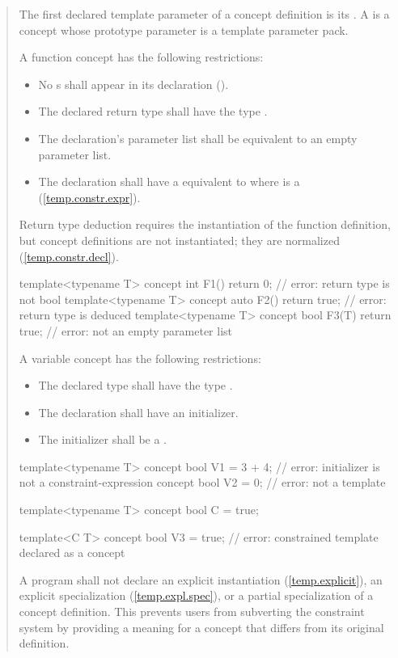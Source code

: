 \begin{quote}
\pnum
The first declared template parameter of a concept definition is its
. 
%
A  is a concept whose prototype parameter
is a template parameter pack.

\pnum
A function concept has the following restrictions:
\begin{itemize}
\item No s shall
     appear in its declaration ().

\item The declared return type shall have the type .

\item The declaration's parameter list shall be equivalent to an empty 
      parameter list.

\item The declaration shall have a  equivalent
to  where  is a 
 (\ref{temp.constr.expr}).
\end{itemize}
%
\enternote
Return type deduction requires the instantiation of the function 
definition, but concept definitions are not instantiated; they
are normalized (\ref{temp.constr.decl}).
\exitnote
%
\enterexample
\begin{codeblock}
template<typename T> 
  concept int F1() { return 0; }      // error: return type is not bool
template<typename T> 
  concept auto F2() { return true; }  // error: return type is deduced
template<typename T> 
  concept bool F3(T) { return true; } // error: not an empty parameter list
\end{codeblock}
\exitexample

\pnum
A variable concept has the following restrictions:
\begin{itemize}
\item The declared type shall have the type .
\item The declaration shall have an initializer.
\item The initializer shall be a .
\end{itemize}
%
\enterexample
\begin{codeblock}
template<typename T> 
  concept bool V1 = 3 + 4; // error: initializer is not a constraint-expression
concept bool V2 = 0;       // error: not a template

template<typename T> concept bool C = true;

template<C T> 
  concept bool V3 = true;  // error: constrained template declared as a concept
\end{codeblock}
\exitexample

\pnum
A program shall not declare an explicit instantiation (\ref{temp.explicit}), 
an explicit specialization (\ref{temp.expl.spec}), or a partial specialization
of a concept definition.
%
\enternote
This prevents users from subverting the constraint system by providing a 
meaning for a concept that differs from its original definition.
\exitnote

\end{quote}
